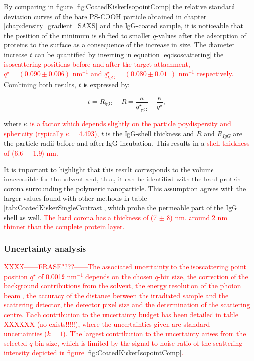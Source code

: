 By comparing in figure \ref{fig:CoatedKiskerIsopointComp} the relative standard deviation curves of the bare PS-COOH particle obtained in chapter \ref{chap:density_gradient_SAXS} and the IgG-coated sample, it is noticeable that the position of the minimum is shifted to smaller $q$-values after the adsorption of proteins to the surface as a consequence of the increase in size. The diameter increase $t$ can be quantified by inserting in equation \ref{eq:isoscattering} the \textcolor{red}{isoscattering positions before and after the target attachment, $q^{\star}=\left( 0.090 \pm 0.006 \right)$ nm$^{-1}$ and $q^{\star}_{IgG}=\left( 0.080 \pm 0.011 \right)$ nm$^{-1}$ respectively.} Combining both results, $t$ is expressed by:


\begin{equation}
t = R_{\text{IgG}} - R = \frac{\kappa}{q^{\star}_{\text{IgG}}}-\frac{\kappa}{q^{\star}} ,
\label{eq:IsopointRadiusDifference}
\end{equation}

where $\kappa$ \textcolor{red}{is a factor which depends slightly on the particle poydispersity and sphericity (typically $\kappa = 4.493$),} $t$ is the IgG-shell thickness and $R$ and $R_{IgG}$ are the particle radii before and after IgG incubation. This results in a \textcolor{red}{shell thickness of (6.6 $\pm$ 1.9) nm.}

It is important to highlight that this result corresponds to the volume inaccessible for the solvent and, thus, it can be identified with the hard protein corona surrounding the polymeric nanoparticle. This assumption agrees with the larger values found with other methods in table \ref{tab:CoatedKiskerSingleContrast}, which probe the permeable part of the IgG shell as well. \textcolor{red}{The hard corona has a thickness of (7 $\pm$ 8) nm, around 2 nm thinner than the complete protein layer.}

\subsubsection{Uncertainty analysis}


\textcolor{red}{XXXX------ERASE????------The associated uncertainty to the isoscattering point position $q^{\star}$ of 0.0019 nm$^{-1}$ depends on the chosen $q$-bin size, the correction of the background contributions from the solvent, the energy resolution of the photon beam \citep{krumrey_high-accuracy_2001}, the accuracy of the distance between the irradiated sample and the scattering detector, the detector pixel size \citep{wernecke_characterization_2014} and the determination of the scattering centre. Each contribution to the uncertainty budget has been detailed in table XXXXXX (no exists!!!!!), where the uncertainties given are standard uncertainties ($k = 1$). The largest contribution to the uncertainty arises from the selected $q$-bin size, which is limited by the signal-to-noise ratio of the scattering intensity depicted in figure \ref{fig:CoatedKiskerIsopointComp}. }

